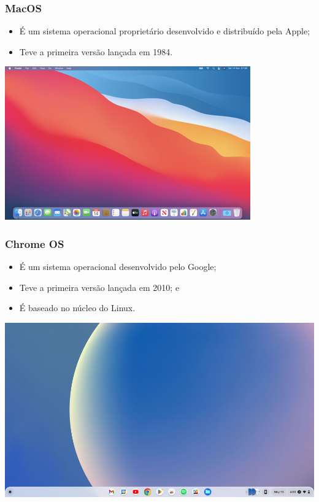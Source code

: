 \documentclass[aspectratio=169]{beamer} %
\begin{document}
\begin{frame}
	\frametitle{MacOS}
	
	\begin{itemize}
		\item É um sistema operacional proprietário desenvolvido e distribuído pela Apple;
		\item Teve a primeira versão lançada em 1984.
	\end{itemize}\vfill
	
	\begin{center}
		\includegraphics[scale=0.45]{img/macosbig}
	\end{center}
\end{frame}

\begin{frame}
	\frametitle{Chrome OS}
	
	\begin{itemize}
		\item É um sistema operacional desenvolvido pelo Google;
		\item Teve a primeira versão lançada em 2010; e
		\item É baseado no núcleo do Linux. 
	\end{itemize}\vfill
	
	\begin{center}
		\includegraphics[scale=0.2]{img/chromeos}
	\end{center}
\end{frame}
\end{document}
